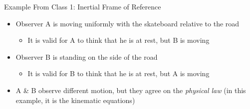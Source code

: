 \documentclass[12pt,compress,aspectratio=169]{beamer}
\begin{document}
\begin{frame}{Example From Class 1: Inertial Frame of Reference}
  \begin{itemize}
  \item Observer A is moving uniformly with the skateboard relative to the
    road
    \begin{itemize}
    \item It is valid for A to think that he is at rest, but B is moving
    \end{itemize}
  \item Observer B is standing on the side of the road
    \begin{itemize}
    \item It is valid for B to think that he is at rest, but A is moving
    \end{itemize}
  \item A \& B observe different motion, but they agree on the \emph{physical
  law} (in this example, it is the kinematic equations)
  \end{itemize}
  \begin{center}
    \vspace{-.1in}
  \end{center}
\end{frame}





%    
\end{document}
